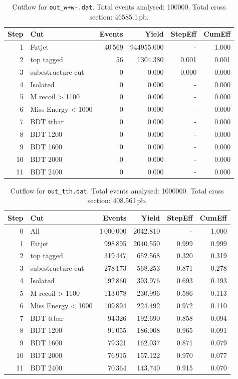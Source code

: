 \documentclass{article}
\begin{document}
\begin{table}[ht]
\centering
\begin{tabular}{r l r r r r}
\toprule
Step & Cut & Events & Yield & StepEff & CumEff \\
\midrule
1 & Fatjet & 40\,569 & 944955.000 & - & 1.000 \\
2 & top tagged & 56 & 1304.380 & 0.001 & 0.001 \\
3 & subestructure cut & 0 & 0.000 & 0.000 & 0.000 \\
4 & Isolated & 0 & 0.000 & - & 0.000 \\
5 & M recoil > 1100 & 0 & 0.000 & - & 0.000 \\
6 & Miss Energy < 1000 & 0 & 0.000 & - & 0.000 \\
7 & BDT ttbar & 0 & 0.000 & - & 0.000 \\
8 & BDT 1200 & 0 & 0.000 & - & 0.000 \\
9 & BDT 1600 & 0 & 0.000 & - & 0.000 \\
10 & BDT 2000 & 0 & 0.000 & - & 0.000 \\
11 & BDT 2400 & 0 & 0.000 & - & 0.000 \\
\bottomrule
\end{tabular}
\caption{Cutflow for \texttt{out\_w+w-.dat}. Total events analysed: 100000. Total cross section: 46585.1\,pb.}
\label{tab:cutflow-out-w-w-dat}
\end{table}

\begin{table}[ht]
\centering
\begin{tabular}{r l r r r r}
\toprule
Step & Cut & Events & Yield & StepEff & CumEff \\
\midrule
0 & All & 1\,000\,000 & 2042.810 & - & 1.000 \\
1 & Fatjet & 998\,895 & 2040.550 & 0.999 & 0.999 \\
2 & top tagged & 319\,447 & 652.568 & 0.320 & 0.319 \\
3 & subestructure cut & 278\,173 & 568.253 & 0.871 & 0.278 \\
4 & Isolated & 192\,860 & 393.976 & 0.693 & 0.193 \\
5 & M recoil > 1100 & 113\,078 & 230.996 & 0.586 & 0.113 \\
6 & Miss Energy < 1000 & 109\,894 & 224.492 & 0.972 & 0.110 \\
7 & BDT ttbar & 94\,326 & 192.690 & 0.858 & 0.094 \\
8 & BDT 1200 & 91\,055 & 186.008 & 0.965 & 0.091 \\
9 & BDT 1600 & 79\,321 & 162.037 & 0.871 & 0.079 \\
10 & BDT 2000 & 76\,915 & 157.122 & 0.970 & 0.077 \\
11 & BDT 2400 & 70\,364 & 143.740 & 0.915 & 0.070 \\
\bottomrule
\end{tabular}
\caption{Cutflow for \texttt{out\_tth.dat}. Total events analysed: 1000000. Total cross section: 408.561\,pb.}
\label{tab:cutflow-out-tth-dat}
\end{table}
\end{document}
